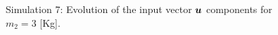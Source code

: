 \begin{figure}[p]
\begin{minipage}[t]{.45\textwidth}
    \end{minipage}  
    \caption{\label{fig:sim7u3}Simulation 7: Evolution of the input vector $\boldsymbol{u}$ components for $m_2=3$ [Kg].}
\end{figure}